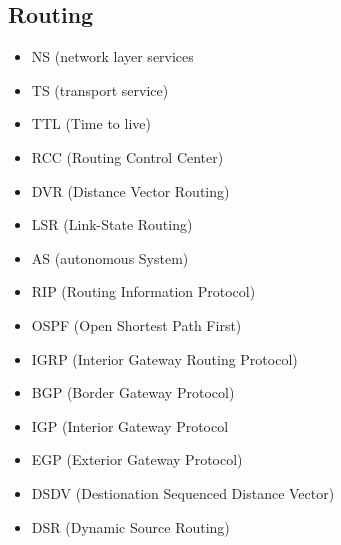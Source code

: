 	\subsection{Routing}
		\begin{itemize}
			\item NS (network layer services
			\item TS (transport service)
			\item TTL (Time to live)
			\item RCC (Routing Control Center)
			\item DVR (Distance Vector Routing)
			\item LSR (Link-State Routing)
			\item AS (autonomous System)
			\item RIP (Routing Information Protocol)
			\item OSPF (Open Shortest Path First)
			\item IGRP (Interior Gateway Routing Protocol)
			\item BGP (Border Gateway Protocol)
			\item IGP (Interior Gateway Protocol
			\item EGP (Exterior Gateway Protocol)
			\item DSDV (Destionation Sequenced Distance Vector)
			\item DSR (Dynamic Source Routing)
		\end{itemize}